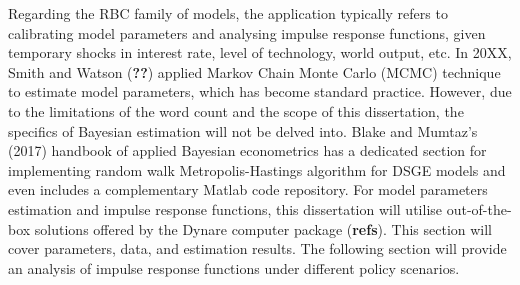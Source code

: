 Regarding the RBC family of models, the application typically refers to calibrating model parameters and analysing impulse response functions, given temporary shocks in interest rate, level of technology, world output, etc. In 20XX, Smith and Watson (\textbf{??}) applied Markov Chain Monte Carlo (MCMC) technique to estimate model parameters, which has become standard practice. However, due to the limitations of the word count and the scope of this dissertation, the specifics of Bayesian estimation will not be delved into. Blake and Mumtaz's (2017) handbook of applied Bayesian econometrics has a dedicated section for implementing random walk Metropolis-Hastings algorithm for DSGE models and even includes a complementary Matlab code repository. For model parameters estimation and impulse response functions, this dissertation will utilise out-of-the-box solutions offered by the Dynare computer package (\textbf{refs}). This section will cover parameters, data, and estimation results. The following section will provide an analysis of impulse response functions under different policy scenarios.

